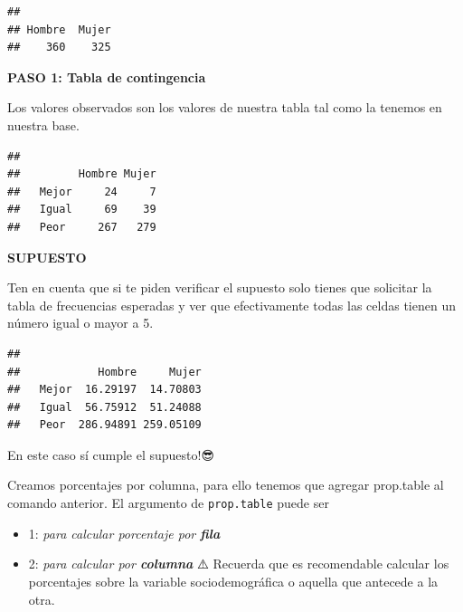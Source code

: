 \documentclass[
]{article}
\newenvironment{Shaded}{\begin{snugshade}}{\end{snugshade}}
\newcommand{\CommentTok}[1]{\textcolor[rgb]{0.56,0.35,0.01}{\textit{#1}}}
\newcommand{\FunctionTok}[1]{\textcolor[rgb]{0.00,0.00,0.00}{#1}}
\newcommand{\NormalTok}[1]{#1}
\newcommand{\OtherTok}[1]{\textcolor[rgb]{0.56,0.35,0.01}{#1}}
\newcommand{\SpecialCharTok}[1]{\textcolor[rgb]{0.00,0.00,0.00}{#1}}
\begin{document}
\begin{verbatim}
## 
## Hombre  Mujer 
##    360    325
\end{verbatim}

\textbf{PASO 1: Tabla de contingencia}

Los valores observados son los valores de nuestra tabla tal como la
tenemos en nuestra base.

\begin{Shaded}
\end{Shaded}

\begin{verbatim}
##        
##         Hombre Mujer
##   Mejor     24     7
##   Igual     69    39
##   Peor     267   279
\end{verbatim}

\textbf{SUPUESTO}

Ten en cuenta que si te piden verificar el supuesto solo tienes que
solicitar la tabla de frecuencias esperadas y ver que efectivamente
todas las celdas tienen un número igual o mayor a 5.

\begin{Shaded}
\end{Shaded}

\begin{verbatim}
##        
##            Hombre     Mujer
##   Mejor  16.29197  14.70803
##   Igual  56.75912  51.24088
##   Peor  286.94891 259.05109
\end{verbatim}

En este caso sí cumple el supuesto!😎

Creamos porcentajes por columna, para ello tenemos que agregar
prop.table al comando anterior. El argumento de \texttt{prop.table}
puede ser

\begin{itemize}
\item
  1: \emph{para calcular porcentaje por \textbf{fila}}
\item
  2: \emph{para calcular por \textbf{columna}} ⚠️ Recuerda que es
  recomendable calcular los porcentajes sobre la variable
  sociodemográfica o aquella que antecede a la otra.
\end{itemize}
\end{document}
